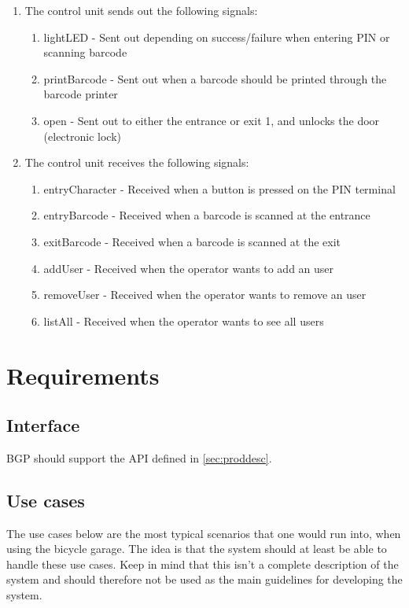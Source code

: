 \documentclass[12pt,titlepage,bibliography=totoc]{article}
\begin{document}
\begin{enumerate}
	\item The control unit sends out the following signals:
	\begin{enumerate}
		\item lightLED - Sent out depending on success/failure when entering PIN or scanning barcode
		\item printBarcode - Sent out when a barcode should be printed through the barcode printer
		\item open - Sent out to either the entrance or exit 1, and unlocks the door (electronic lock)
	\end{enumerate}
	\item The control unit receives the following signals:
	\begin{enumerate}
		\item entryCharacter - Received when a button is pressed on the PIN terminal
		\item entryBarcode - Received when a barcode is scanned at the entrance
		\item exitBarcode - Received when a barcode is scanned at the exit
		\item addUser - Received when the operator wants to add an user
		\item removeUser - Received when the operator wants to remove an user
		\item listAll - Received when the operator wants to see all users
	\end{enumerate}
\end{enumerate}

\section{Requirements}
\subsection{Interface}
BGP should support the API defined in \cref{sec:proddesc}.
\subsection{Use cases}
\label{sec:cases}
The use cases below are the most typical scenarios that one would run into, when using the bicycle garage. The idea is that the system should at least be able to handle these use cases. Keep in mind that this isn't a complete description of the system and should therefore not be used as the main guidelines for developing the system.
\end{document}
